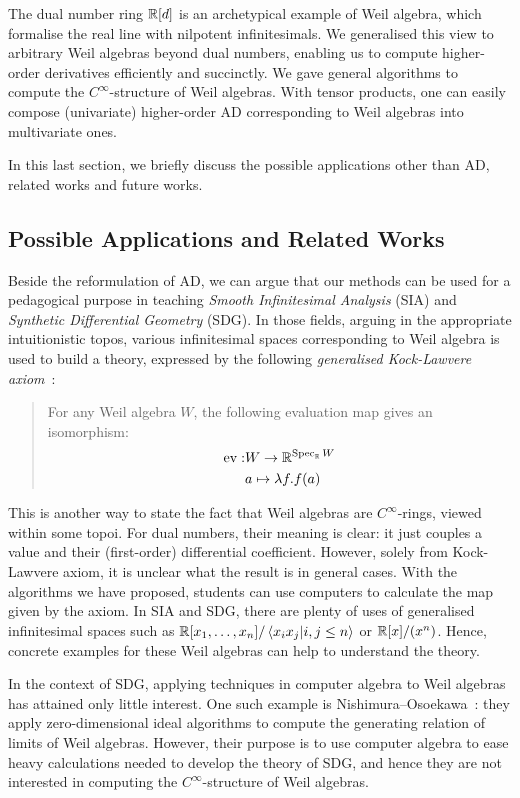 \documentclass[runningheads]{llncs}
\begin{document}
The dual number ring $\mathbb{R}[d]$ is an archetypical example of Weil algebra, which formalise the real line with nilpotent infinitesimals.
We generalised this view to arbitrary Weil algebras beyond dual numbers, enabling us to compute higher-order derivatives efficiently and succinctly.
We gave general algorithms to compute the $C^\infty$-structure of Weil algebras.
With tensor products, one can easily compose (univariate) higher-order AD corresponding to Weil algebras into multivariate ones.

In this last section, we briefly discuss the possible applications other than AD, related works and future works.

\subsection{Possible Applications and Related Works}
Beside the reformulation of AD, we can argue that our methods can be used for a pedagogical purpose in teaching \emph{Smooth Infinitesimal Analysis} (SIA) and \emph{Synthetic Differential Geometry} (SDG).
In those fields, arguing in the appropriate intuitionistic topos, various infinitesimal spaces corresponding to Weil algebra is used to build a theory, expressed by the following \emph{generalised Kock-Lawvere axiom}~\cite{Moerdijk:1991aa}:

\begin{quote}
  For any Weil algebra $W$, the following evaluation map gives an isomorphism:
  \begin{align*}
    \mathop{\mathrm{ev}}: &W \to   \mathbb{R}^{\mathop{\mathrm{Spec}}_{\mathbb{R}}{W}}\\
       &a \mapsto \lambda f. f(a)
  \end{align*}
\end{quote}
This is another way to state the fact that Weil algebras are $C^\infty$-rings, viewed within some topoi.
For dual numbers, their meaning is clear: it just couples a value and their (first-order) differential coefficient.
However, solely from Kock-Lawvere axiom, it is unclear what the result is in general cases.
With the algorithms we have proposed, students can use computers to calculate the map given by the axiom.
In SIA and SDG, there are plenty of uses of generalised infinitesimal spaces such as $\mathbb{R}[x_1,\dots, x_n]/\braket{x_i x_j | i, j \leq n}$ or $\mathbb{R}[x]/(x^n)$.
Hence, concrete examples for these Weil algebras can help to understand the theory.

In the context of SDG, applying techniques in computer algebra to Weil algebras has attained only little interest.
One such example is Nishimura--Osoekawa~\cite{Nishimura:2007aa}: they apply zero-dimensional ideal algorithms to compute the generating relation of limits of Weil algebras.
However, their purpose is to use computer algebra to ease heavy calculations needed to develop the theory of SDG, and hence they are not interested in computing the $C^\infty$-structure of Weil algebras.
\end{document}
